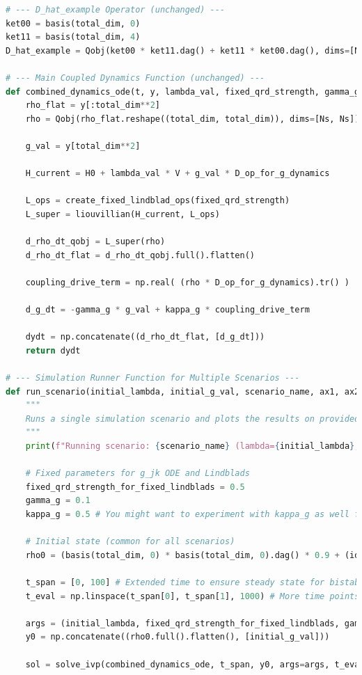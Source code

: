 \documentclass[9pt]{article}
\begin{document}
\begin{lstlisting}[language=Python, basicstyle=\ttfamily\footnotesize, breaklines=true, frame=single, caption={Python Code for Bistability in the Coupled System}, label={lst:qrd_code}]
# --- D_hat_example Operator (unchanged) ---
ket00 = basis(total_dim, 0)
ket11 = basis(total_dim, 4)
D_hat_example = Qobj(ket00 * ket11.dag() + ket11 * ket00.dag(), dims=[Ns, Ns])

# --- Main Coupled Dynamics Function (unchanged) ---
def combined_dynamics_ode(t, y, lambda_val, fixed_qrd_strength, gamma_g, kappa_g, D_op_for_g_dynamics):
    rho_flat = y[:total_dim**2]
    rho = Qobj(rho_flat.reshape((total_dim, total_dim)), dims=[Ns, Ns])
    
    g_val = y[total_dim**2]

    H_current = H0 + lambda_val * V + g_val * D_op_for_g_dynamics
    
    L_ops = create_fixed_lindblad_ops(fixed_qrd_strength)
    L_super = liouvillian(H_current, L_ops)

    d_rho_dt_qobj = L_super(rho)
    d_rho_dt_flat = d_rho_dt_qobj.full().flatten()

    coupling_drive_term = np.real( (rho * D_op_for_g_dynamics).tr() )

    d_g_dt = -gamma_g * g_val + kappa_g * coupling_drive_term

    dydt = np.concatenate((d_rho_dt_flat, [d_g_dt]))
    return dydt

# --- Simulation Runner Function for Multiple Scenarios ---
def run_scenario(initial_lambda, initial_g_val, scenario_name, ax1, ax2, ax3):
    """
    Runs a single simulation scenario and plots the results on provided axes.
    """
    print(f"Running scenario: {scenario_name} (lambda={initial_lambda}, g_init={initial_g_val})")

    # Fixed parameters for g_jk ODE and Lindblads
    fixed_qrd_strength_for_fixed_lindblads = 0.5
    gamma_g = 0.1
    kappa_g = 0.5 # You might want to experiment with kappa_g as well for bistability!

    # Initial state (common for all scenarios)
    rho0 = (basis(total_dim, 0) * basis(total_dim, 0).dag() * 0.9 + (identity(total_dim) * 0.1 / total_dim)).unit()

    t_span = [0, 100] # Extended time to ensure steady state for bistability check
    t_eval = np.linspace(t_span[0], t_span[1], 1000) # More time points

    args = (initial_lambda, fixed_qrd_strength_for_fixed_lindblads, gamma_g, kappa_g, D_hat_example)
    y0 = np.concatenate((rho0.full().flatten(), [initial_g_val]))

    sol = solve_ivp(combined_dynamics_ode, t_span, y0, args=args, t_eval=t_eval, method='RK45', rtol=1e-6, atol=1e-8)


\end{lstlisting}
\end{document}
